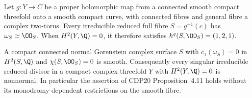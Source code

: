 
\begin{proposition}\hypertarget{tag-01AT}{}\label{cdp:st:A.4.4}


Let $g:Y\to C$ be a proper holomorphic map from a connected smooth compact threefold onto a smooth compact curve, with connected fibres and general fibre a complex two-torus. Every irreducible reduced full fibre $S=g^{-1}(c)$ has $\omega_S\simeq\OO_S$. When $H^2(Y,\Q)=0$, it therefore satisfies $h^q(S,\OO_S)=(1,2,1)$.
\end{proposition}

\begin{proposition}\hypertarget{tag-01BA}{}\label{cdp:st:A.5.2}


A compact connected normal Gorenstein complex surface $S$ with $c_1(\omega_S)=0$ in $H^2(S,\Q)$ and $\chi(S,\OO_S)=0$ is smooth. Consequently every singular irreducible reduced divisor in a compact complex threefold $Y$ with $H^2(Y,\Q)=0$ is nonnormal. In particular the assertion of CDP20 Proposition~4.11 holds without its monodromy-dependent restrictions on the smooth fibre.
\end{proposition}

